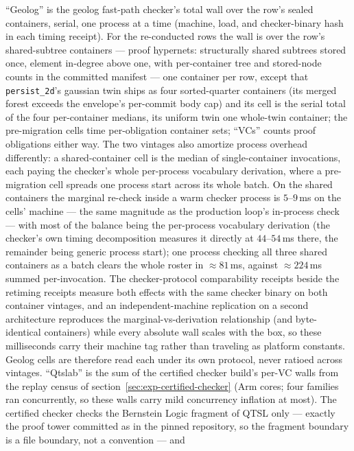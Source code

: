 ``Geolog'' is the geolog fast-path
checker's total wall over the row's sealed containers, serial, one
process at a time (machine, load, and checker-binary hash in each
timing receipt). For the re-conducted rows the wall is over the
row's shared-subtree containers --- proof hypernets: structurally
shared subtrees stored once, element in-degree above one, with
per-container tree and stored-node counts in the committed manifest ---
one container per row, except that \texttt{persist\_2d}'s gaussian twin
ships as four sorted-quarter containers (its merged forest exceeds the
envelope's per-commit body cap) and its cell is the serial total of the
four per-container medians, its uniform twin one whole-twin container;
the pre-migration cells time per-obligation
container sets; ``VCs'' counts proof obligations either way.
The two vintages also amortize process overhead differently: a
shared-container cell is the median of single-container invocations,
each paying the checker's whole per-process vocabulary derivation,
where a pre-migration cell spreads one process start across its whole
batch. On the shared containers the marginal re-check inside a warm
checker process is $5$--$9$\,ms on the cells' machine --- the same
magnitude as the production loop's in-process check --- with most of
the balance being the per-process vocabulary derivation (the checker's
own timing decomposition measures it directly at $44$--$54$\,ms there,
the remainder being generic process start); one process checking all
three shared containers as a batch clears the whole roster in
$\approx 81$\,ms, against $\approx 224$\,ms summed per-invocation. The
checker-protocol comparability receipts beside the retiming receipts
measure both effects with the same checker binary on both container
vintages, and an independent-machine replication on a second
architecture reproduces the marginal-vs-derivation relationship (and
byte-identical containers) while every absolute wall scales with the
box, so these milliseconds carry their machine tag rather than
traveling as platform constants. Geolog cells are therefore read each
under its own protocol, never ratioed across vintages.
``Qtslab'' is the sum of the
certified checker build's per-VC walls from the replay census
of section~\ref{sec:exp-certified-checker} (Arm cores; four families
ran concurrently, so these walls carry mild concurrency inflation at
most). The certified checker checks the Bernstein Logic
fragment of QTSL only --- exactly the proof tower committed as
 in the pinned  repository, so
the fragment boundary is a file boundary, not a convention --- and
